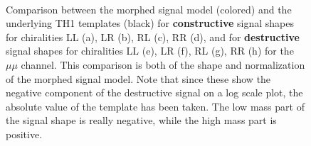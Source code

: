 {\begin{figure}[htp]
 \\
\vspace{-0.3em}
\caption{Comparison between the morphed signal model (colored) and the underlying TH1 templates (black) for \textbf{constructive} signal shapes for chiralities LL (a), LR (b), RL (c), RR (d), and for \textbf{destructive} signal shapes for chiralities LL (e), LR (f), RL (g), RR (h) for the $\mu\mu$ channel. This comparison is both of the shape and normalization of the morphed signal model. Note that since these show the negative component of the destructive signal on a log scale plot, the absolute value of the template has been taken. The low mass part of the signal shape is really negative, while the high mass part is positive.}
\label{fig:ciSigModelTemplateCompMm}
\end{figure}
\clearpage
}


